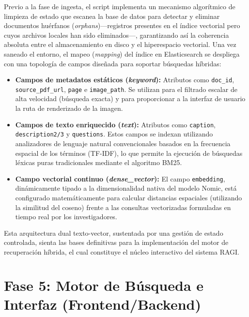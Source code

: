 \documentclass[a4paper]{report}
\begin{document}
Previo a la fase de ingesta, el script implementa un mecanismo algorítmico de limpieza de estado que escanea la base de datos para detectar y eliminar documentos huérfanos (\textit{orphans})—registros presentes en el índice vectorial pero cuyos archivos locales han sido eliminados—, garantizando así la coherencia absoluta entre el almacenamiento en disco y el hiperespacio vectorial. Una vez saneado el entorno, el mapeo (\textit{mapping}) del índice en Elasticsearch se despliega con una topología de campos diseñada para soportar búsquedas híbridas:

\begin{itemize}
    \item \textbf{Campos de metadatos estáticos (\textit{keyword}):} Atributos como \texttt{doc\_id}, \texttt{source\_pdf\_url}, \texttt{page} e \texttt{image\_path}. Se utilizan para el filtrado escalar de alta velocidad (búsqueda exacta) y para proporcionar a la interfaz de usuario la ruta de renderizado de la imagen.
    \item \textbf{Campos de texto enriquecido (\textit{text}):} Atributos como \texttt{caption}, \texttt{description2/3} y \texttt{questions}. Estos campos se indexan utilizando analizadores de lenguaje natural convencionales basados en la frecuencia espacial de los términos (TF-IDF), lo que permite la ejecución de búsquedas léxicas puras tradicionales mediante el algoritmo BM25.
    \item \textbf{Campo vectorial continuo (\textit{dense\_vector}):} El campo \texttt{embedding}, dinámicamente tipado a la dimensionalidad nativa del modelo Nomic, está configurado matemáticamente para calcular distancias espaciales (utilizando la similitud del coseno) frente a las consultas vectorizadas formuladas en tiempo real por los investigadores.
\end{itemize}

Esta arquitectura dual texto-vector, sustentada por una gestión de estado controlada, sienta las bases definitivas para la implementación del motor de recuperación híbrida, el cual constituye el núcleo interactivo del sistema RAGI.

\begingroup
\let\clearpage\relax %
\let\newpage\relax   %
\vspace{0.5cm}       %

\section{Fase 5: Motor de Búsqueda e Interfaz (Frontend/Backend)}
\label{sec:metodologia_buscador}
\endgroup
\end{document}
